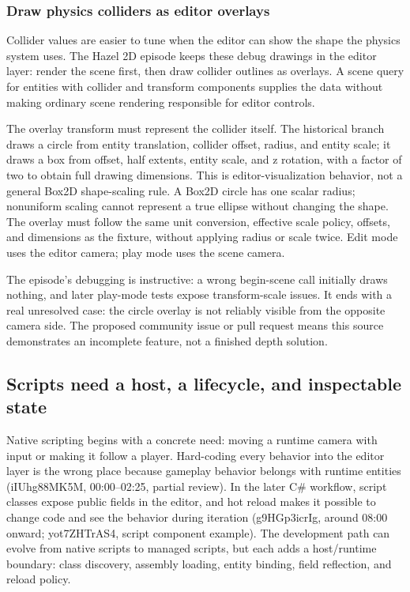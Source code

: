 \subsubsection{Draw physics colliders as editor overlays}\label{06-engine-ii-ch033-draw-physics-colliders-as-editor-overlays}

Collider values are easier to tune when the editor can show the shape the physics system uses. The Hazel 2D episode keeps these debug drawings in the editor layer: render the scene first, then draw collider outlines as overlays. A scene query for entities with collider and transform components supplies the data without making ordinary scene rendering responsible for editor controls.

The overlay transform must represent the collider itself. The historical branch draws a circle from entity translation, collider offset, radius, and entity scale; it draws a box from offset, half extents, entity scale, and z rotation, with a factor of two to obtain full drawing dimensions. This is editor-visualization behavior, not a general Box2D shape-scaling rule. A Box2D circle has one scalar radius; nonuniform scaling cannot represent a true ellipse without changing the shape. The overlay must follow the same unit conversion, effective scale policy, offsets, and dimensions as the fixture, without applying radius or scale twice. Edit mode uses the editor camera; play mode uses the scene camera.

The episode's debugging is instructive: a wrong begin-scene call initially draws nothing, and later play-mode tests expose transform-scale issues. It ends with a real unresolved case: the circle overlay is not reliably visible from the opposite camera side. The proposed community issue or pull request means this source demonstrates an incomplete feature, not a finished depth solution.

\subsection{Scripts need a host, a lifecycle, and inspectable state}\label{06-engine-ii-ch033-scripts-need-a-host-a-lifecycle-and-inspectable-state}

Native scripting begins with a concrete need: moving a runtime camera with input or making it follow a player. Hard-coding every behavior into the editor layer is the wrong place because gameplay behavior belongs with runtime entities (iIUhg88MK5M, 00:00--02:25, partial review). In the later C\# workflow, script classes expose public fields in the editor, and hot reload makes it possible to change code and see the behavior during iteration (g9HGp3icrIg, around 08:00 onward; yot7ZHTrAS4, script component example). The development path can evolve from native scripts to managed scripts, but each adds a host/runtime boundary: class discovery, assembly loading, entity binding, field reflection, and reload policy.

